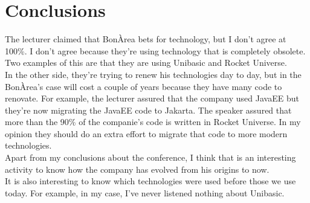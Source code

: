 \documentclass[12pt]{article}
\begin{document}
\section*{Conclusions}
The lecturer claimed that BonÀrea bets for technology, but I don't agree at 100\%. I don't agree because they're using technology that is completely obsolete. Two examples of this are that they are using Unibasic and Rocket Universe.\\
In the other side, they're trying to renew his technologies day to day, but in the BonÀrea's case will cost a couple of years because they have many code to renovate. For example, the lecturer assured that the company used JavaEE but they're now migrating the JavaEE code to Jakarta.
The speaker assured that more than the 90\% of the companie's code is written in Rocket Universe. In my opinion they should do an extra effort to migrate that code to more modern technologies.\\
Apart from my conclusions about the conference, I think that is an interesting activity to know how the company has evolved from his origins to now. \\
It is also interesting to know which technologies were used before those we use today. For example, in my case, I've never listened nothing about Unibasic.\\
\end{document}
